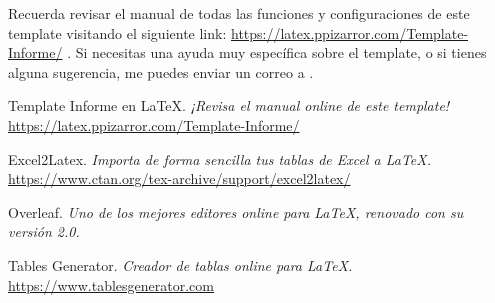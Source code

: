 		Recuerda revisar el manual de todas las funciones y configuraciones de este template visitando el siguiente link: \url{https://latex.ppizarror.com/Template-Informe/} \cite{templateinforme}. Si necesitas una ayuda muy específica sobre el template, o si tienes alguna sugerencia, me puedes enviar un correo a .


\newpage %
\begin{references}
	Template Informe en \LaTeX.
	\textit{¡Revisa el manual online de este template!} \\
	\url{https://latex.ppizarror.com/Template-Informe/}

	Excel2Latex.
	\textit{Importa de forma sencilla tus tablas de Excel a \LaTeX.} \\
	\url{https://www.ctan.org/tex-archive/support/excel2latex/}

	Overleaf.
	\textit{Uno de los mejores editores online para \LaTeX, renovado con su versión 2.0.} \\
	\href{https://es.overleaf.com}{}
	
	Tables Generator.
	\textit{Creador de tablas online para \LaTeX.}\\
	\url{https://www.tablesgenerator.com}
\end{references}


